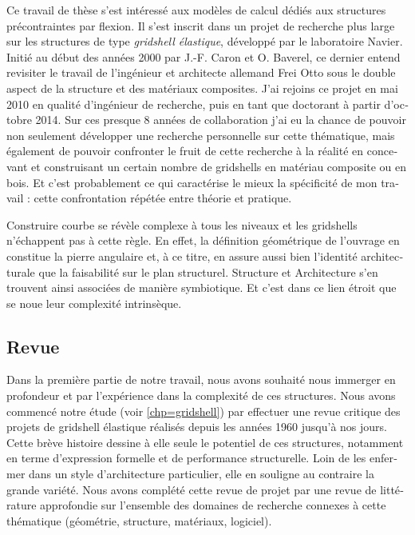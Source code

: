 \begin{otherlanguage}{french}

Ce travail de thèse s'est intéressé aux modèles de calcul dédiés aux structures précontraintes par flexion. Il s'est inscrit dans un projet de recherche plus large sur les structures de type \emph{gridshell élastique}, développé par le laboratoire Navier. Initié au début des années 2000 par J.-F. Caron et O. Baverel, ce dernier entend revisiter le travail de l'ingénieur et architecte allemand Frei Otto sous le double aspect de la structure et des matériaux composites. J'ai rejoins ce projet en mai 2010 en qualité d'ingénieur de recherche, puis en tant que doctorant à partir d'octobre 2014. Sur ces presque 8 années de collaboration j'ai eu la chance de pouvoir non seulement développer une recherche personnelle sur cette thématique, mais également de pouvoir confronter le fruit de cette recherche à la réalité en concevant et construisant un certain nombre de gridshells en matériau composite ou en bois. Et c'est probablement ce qui caractérise le mieux la spécificité de mon travail : cette confrontation répétée entre théorie et pratique.

Construire courbe se révèle complexe à tous les niveaux et les gridshells n'échappent pas à cette règle. En effet, la définition géométrique de l'ouvrage en constitue la pierre angulaire et, à ce titre, en assure aussi bien l'identité architecturale que la faisabilité sur le plan structurel. Structure et Architecture s'en trouvent ainsi associées de manière symbiotique. Et c'est dans ce lien étroit que se noue leur complexité intrinsèque.

\subsection*{Revue}

Dans la première partie de notre travail, nous avons souhaité nous immerger en profondeur et par l'expérience dans la complexité de ces structures. Nous avons commencé notre étude (voir \cref{chp=gridshell}) par effectuer une revue critique des projets de gridshell élastique réalisés depuis les années 1960 jusqu'à nos jours. Cette brève histoire dessine à elle seule le potentiel de ces structures, notamment en terme d'expression formelle et de performance structurelle. Loin de les enfermer dans un style d'architecture particulier, elle en souligne au contraire la grande variété. Nous avons complété cette revue de projet par une revue de littérature approfondie sur l'ensemble des domaines de recherche connexes à cette thématique (géométrie, structure, matériaux, logiciel).


\end{otherlanguage}
